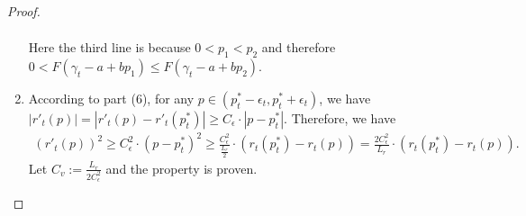 \begin{proof}
\begin{enumerate}
\begin{equation}
\begin{aligned}
        \end{aligned}
    \end{equation}
    Here the third line is because $0<p_1<p_2$ and therefore $0< F(\gamma_t-a+bp_1)\leq F(\gamma_t-a+bp_2)$.
    \\
    \item According to part (6), for any $p\in(p_t^*-\epsilon_t, p_t^*+\epsilon_t)$, we have $|r'_t(p)|=|r'_t(p)-r'_t(p_t^*)|\geq C_{\epsilon}\cdot|p-p_t^*|$. Therefore, we have
    \begin{equation}
        \label{eq:loss_leq_derivative_square}
        \begin{aligned}
            (r'_t(p))^2\geq C_{\epsilon}^2\cdot(p-p_t^*)^2\geq\frac{C_{\epsilon}^2}{\frac{L_r}2}\cdot(r_t(p_t^*)-r_t(p))=\frac{2C_{\epsilon}^2}{L_r}\cdot(r_t(p_t^*)-r_t(p)).
        \end{aligned}
    \end{equation}
    Let $C_v:=\frac{L_r}{2C_{\epsilon}^2}$ and the property is proven.
\end{enumerate}
\end{proof}